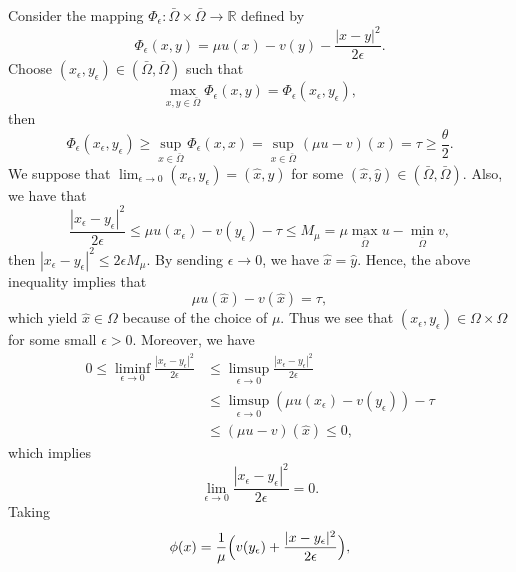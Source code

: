 \documentclass[12pt,a4paper]{ctexart}
\begin{document}
Consider the mapping $\Phi_{\epsilon}: \bar \Omega \times \bar \Omega \to \mathbb{R}$ defined by
\begin{equation}
    \Phi_{\epsilon} (x, y) = \mu u(x) - v(y) - \frac{|x - y|^{2}}{2 \epsilon}.
\end{equation}
Choose $(x_\epsilon, y_\epsilon) \in (\bar \Omega, \bar \Omega)$ such that
\begin{equation*}
    \max_{x, y \in \bar \Omega} \Phi_{\epsilon} (x, y) = \Phi_{\epsilon} (x_\epsilon, y_\epsilon),
\end{equation*}
then 
\begin{equation*}
    \Phi_{\epsilon} (x_\epsilon, y_\epsilon) \geq \sup_{x \in \bar \Omega} \Phi_{\epsilon} (x, x) = \sup_{x \in \bar \Omega} (\mu u - v)(x) = \tau \geq \frac{\theta}{2}. 
\end{equation*}
We suppose that $\lim_{\epsilon \to 0} (x_\epsilon, y_\epsilon) = (\hat x, \hat y)$ for some $(\hat x, \hat y) \in (\bar \Omega, \bar \Omega)$. Also, we have that
\begin{equation*}
    \frac{|x_\epsilon - y_\epsilon|^{2}}{2 \epsilon} \leq \mu u(x_\epsilon) - v(y_\epsilon) - \tau \leq M_{\mu} = \mu \max_{\bar \Omega} u - \min_{\bar \Omega} v,
\end{equation*}
then $|x_\epsilon - y_\epsilon|^{2} \leq 2 \epsilon M_{\mu} $. By sending $\epsilon \to 0$, we have $\hat x = \hat y$. Hence, the above inequality implies that
\begin{equation*}
    \mu u(\hat x) - v(\hat x) = \tau,
\end{equation*}
which yield $\hat x \in \Omega$ because of the choice of $\mu$. Thus we see that $(x_{\epsilon}, y_\epsilon) \in \Omega \times \Omega$ for some small $\epsilon > 0$. Moreover, we have
\begin{align*}
    0 \leq \liminf_{\epsilon \to 0} \frac{|x_\epsilon - y_\epsilon|^{2}}{2 \epsilon} & \leq \limsup_{\epsilon \to 0} \frac{|x_\epsilon - y_\epsilon|^{2}}{2 \epsilon} \\
    & \leq  \limsup_{\epsilon \to 0} (\mu u(x_{\epsilon}) - v(y_\epsilon)) - \tau \\
    & \leq (\mu u - v )(\hat x)  \leq 0,
\end{align*}
which implies
\begin{equation*}
    \lim_{\epsilon \to 0} \frac{|x_\epsilon - y_\epsilon|^{2}}{2 \epsilon} = 0.
\end{equation*}
Taking 
\begin{equation*}
    \phi(x) = \frac{1}{\mu} \Big{(} v(y_\epsilon) + \frac{|x - y_\epsilon|^{2}}{2 \epsilon} \Big{)},
\end{equation*}
\end{document}
